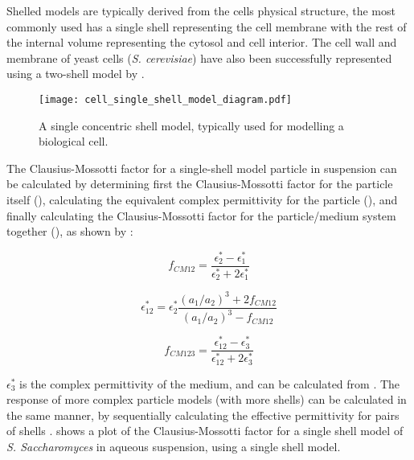 Shelled models are typically derived from the cells physical structure, the most commonly used has a single shell representing the cell membrane with the rest of the internal volume representing the cytosol and cell interior. The cell wall and membrane of yeast cells (\textit{S. cerevisiae}) have also been successfully represented using a two-shell model by \cite{Huang:1992}.

\begin{figure}
 \centering
 \texttt{[image: cell\_single\_shell\_model\_diagram.pdf]}
 \caption{A single concentric shell model, typically used for modelling a biological cell.}
 \label{fig:cell_single_shell_model_diagram}
\end{figure}

The Clausius-Mossotti factor for a single-shell model particle in suspension can be calculated by determining first the Clausius-Mossotti factor for the particle itself (), calculating the equivalent complex permittivity for the particle (), and finally calculating the Clausius-Mossotti factor for the particle/medium system together (), as shown by \cite{Huang:1992}:

\begin{equation}
 f_{CM12}=\frac{\epsilon_{2}^{*}-\epsilon_{1}^{*}}{\epsilon_{2}^{*}+2\epsilon_{1}^{*}}
\label{eqn:single_shell_1}
\end{equation}

\begin{equation}
 \epsilon_{12}^{*}=\epsilon_{2}^{*}\frac{(a_{1}/a_{2})^{3}+2f_{CM12}}{(a_{1}/a_{2})^{3}-f_{CM12}}
\label{eqn:single_shell_2}
\end{equation}

\begin{equation}
 f_{CM123}=\frac{\epsilon_{12}^{*}-\epsilon_{3}^{*}}{\epsilon_{12}^{*}+2\epsilon_{3}^{*}}
\label{eqn:single_shell_3}
\end{equation}

$\epsilon_{3}^{*}$ is the complex permittivity of the medium, and can be calculated from . The response of more complex particle models (with more shells) can be calculated in the same manner, by sequentially calculating the effective permittivity for pairs of shells \citep{Huang:1992}.  shows a plot of the Clausius-Mossotti factor for a single shell model of \textit{S. Saccharomyces} in aqueous suspension, using a single shell model.

